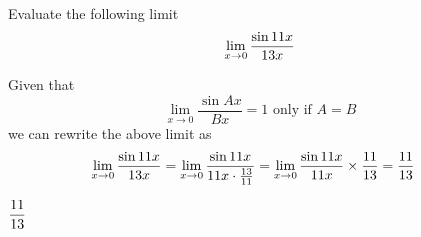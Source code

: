 



\question[4] Evaluate the following limit 
\[ \lim_{x\to 0}\dfrac{\sin11 x}{13 x}\]

\watchout[-40pt]

\begin{solution}[\mcq]
	Given that
	\[ \lim_{x\to 0}\dfrac{\sin Ax}{Bx} = 1\text{ only if } A = B \] 
	we can rewrite the above limit as 
  \begin{align}
    \lim_{x\to 0}\dfrac{\sin11 x}{13 x} &= 
    \lim_{x\to 0}\dfrac{\sin11 x}{11 x\cdot\frac{13}{11}} = 
		\lim_{x\to 0}\dfrac{\sin11 x}{11 x}\times\dfrac{11}{13} = \dfrac{11}{13}
  \end{align}
\end{solution}

\ifprintanswers\begin{codex}$\dfrac{11}{13}$\end{codex}\fi
